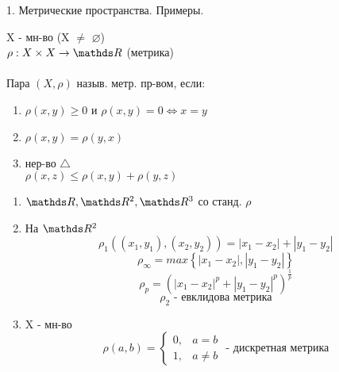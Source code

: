 \documentclass[11pt, fleqn]{article}
\begin{document}
    \begin{question}{1. Метрические пространства. Примеры.}
        \begin{definition}
            X - мн-во (X $\neq$ $\varnothing$) \\
            $\rho: X \times X \rightarrow \R$ (метрика)\\ \\
            Пара $(X, \rho)$ назыв. метр. пр-вом, если:
            \begin{enumerate}
                \item $\rho(x, y) \geq 0$ и $\rho(x, y) = 0 \Leftrightarrow x = y$
                \item $\rho(x, y) = \rho(y, x)$
                \item нер-во $\bigtriangleup$ \\ $\rho(x, z) \leq \rho(x, y) + \rho(y, z)$
            \end{enumerate}
        \end{definition}

        \begin{examples}
            \begin{enumerate}
                \item $\R, \R^2, \R^3$ со станд. $\rho$
                \item На $\R^2$
                      \[\rho_1((x_1, y_1), (x_2, y_2)) = |x_1 - x_2| + |y_1 - y_2|\]
                      \[\rho_\infty = max\left\{|x_1 - x_2|, |y_1 - y_2|\right\}\]
                      \[\rho_p = (|x_1 - x_2|^p + |y_1 - y_2|^p)^{\frac{1}{p}}\]
                      \[\rho_2 \text{ - евклидова метрика}\]
                \item X - мн-во\\
                    \[\rho(a, b) =  \begin{cases}
                            0, &a = b\\
                            1, &a \neq b
                                \end{cases}\text{ - дискретная метрика}\]
            \end{enumerate}
        \end{examples}

    \end{question}
\end{document}
